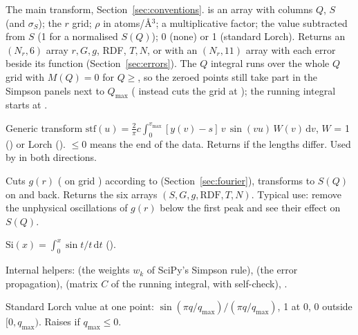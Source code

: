 \documentclass[11pt,a4paper]{article}
\begin{document}
  \newbeh
The main transform, Section~\ref{sec:conventions}.  is an
array with columns $Q$, $S$ (and $\sigma_S$);  the $r$ grid;
 $\rho$ in atoms/\AA$^3$;  a multiplicative
factor;  the value subtracted from $S$ (1 for a normalised
$S(Q)$);  0 (none) or 1 (standard Lorch). Returns an
$(N_r, 6)$ array $r, G, g$, RDF, $T, N$, or with 
an $(N_r, 11)$ array with each error beside its function
(Section~\ref{sec:errors}). The $Q$ integral runs over the whole $Q$ grid
with $M(Q)=0$ for $Q\ge$, so the zeroed points still take part
in the Simpson panels next to $Q_\mathrm{max}$ ( instead
cuts the grid at ); the running integral starts at .

 
Generic transform
$\mathrm{stf}(u) = \frac2\pi c\int_0^{v_\mathrm{max}} [y(v)-s]\,v\,\sin(vu)\,W(v)\,\mathrm{d}v$,
$W$ = 1 () or Lorch (). $\le0$ means the
end of the data. Returns  if the lengths differ. Used by
 in both directions.

 
Cuts $g(r)$ ( on grid ) according to 
(Section~\ref{sec:fourier}), transforms to $S(Q)$ on  and back.
Returns the six arrays $(S, G, g, \mathrm{RDF}, T, N)$. Typical use: remove
the unphysical oscillations of $g(r)$ below the first peak and see their
effect on $S(Q)$.

 
$\mathrm{Si}(x)=\int_0^x \sin t/t\,\mathrm{d}t$ ().

\noindent Internal helpers:  (the weights $w_k$ of
SciPy's Simpson rule),  (the error
propagation),  (matrix $C$ of the running
integral, with self-check), .


 
Standard Lorch value at one point: $\sin(\pi q/q_\mathrm{max})/(\pi q/q_\mathrm{max})$,
1 at 0, 0 outside $[0, q_\mathrm{max})$. Raises if $q_\mathrm{max}\le0$.
\end{document}
